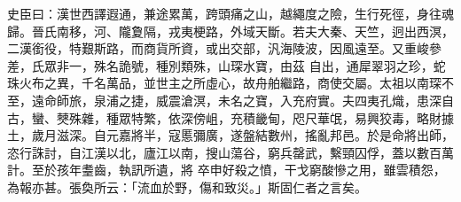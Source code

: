 \begin{pinyinscope}
 史臣曰：漢世西譯遐通，兼途累萬，跨頭痛之山，越繩度之險，生行死徑，身往魂歸。晉氏南移，河、隴夐隔，戎夷梗路，外域天斷。若夫大秦、天竺，迥出西溟，二漢銜役，特艱斯路，而商貨所資，或出交部，汎海陵波，因風遠至。又重峻參差，氏眾非一，殊名詭號，種別類殊，山琛水寶，由茲
 自出，通犀翠羽之珍，蛇珠火布之異，千名萬品，並世主之所虛心，故舟舶繼路，商使交屬。太祖以南琛不至，遠命師旅，泉浦之捷，威震滄溟，未名之寶，入充府實。夫四夷孔熾，患深自古，蠻、僰殊雜，種眾特繁，依深傍岨，充積畿甸，咫尺華氓，易興狡毒，略財據土，歲月滋深。自元嘉將半，寇慝彌廣，遂盤結數州，搖亂邦邑。於是命將出師，恣行誅討，自江漢以北，廬江以南，搜山蕩谷，窮兵罄武，繫頸囚俘，蓋以數百萬計。至於孩年耋齒，執訊所遺，將
 卒申好殺之憤，干戈窮酸慘之用，雖雲積怨，為報亦甚。張奐所云：「流血於野，傷和致災。」斯固仁者之言矣。



\end{pinyinscope}